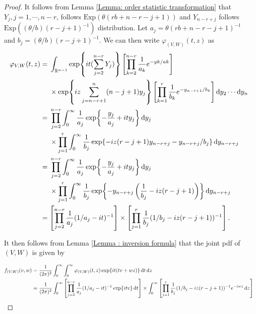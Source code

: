 \documentclass{report}
\begin{document}
\begin{proof}
   It follows from Lemma \ref{Lemma: order statistic transformation} that $Y_j, j = 1, \cdots, n - r$, follows $\mathrm{Exp}(\theta(rb+n-r-j+1))$
   and $Y_{n-r+j}$ follows $\mathrm{Exp}((\theta/b)(r-j+1)^{-1})$ distribution. Let $a_j = \theta(rb+n-r-j+1)^{-1}$ and $b_j =(\theta/b)(r-j+1)^{-1}$.
   We can then write $\varphi_{(V,W)}(t,z)$ as
   \begin{align*}
    \varphi_{V,W}(t,z) &= \begin{aligned}[t]
        &\int_{\RR^{n-1}} \exp{it( \sumj[2]{n-r} Y_j)}\left[\prodk[2]{n-r} \frac{1}{a_k}e^{-yk/ak}\right]
        \\
        &\times \exp{iz \sumj[n-r+1]{n}(n-j+1)y_j} \left[ \prodk{r} \frac{1}{b_k}e^{-y_{n-r+1}/b_k}\right] \dd{y_2}\cdots \dd{y_n}
    \end{aligned}
    \\
      &= \begin{aligned}[t]
        & \prodj[2]{n-r} \int_0^\infty  \frac{1}{a_j}\exp{- \frac{y_j}{a_j} + ity_j} \dd{y_j}
        \\
        &\times \prodj{r} \int_0^\infty \frac{1}{b_j} \exp{-iz(r-j+1)y_{n-r+j} -y_{n-r+j}/b_j} \dd{y_{n-r+j}}
    \end{aligned}
    \\
    &= \begin{aligned}[t]
        & \prodj[2]{n-r} \int_0^\infty  \frac{1}{a_j}\exp{- \frac{y_j}{a_j} + ity_j} \dd{y_j}
        \\
        &\times \prodj{r} \int_0^\infty \frac{1}{b_j} \exp{-y_{n-r+j}\left(\frac{1}{b_j}-iz(r-j+1)\right)} \dd{y_{n-r+j}}
    \end{aligned}
    \\
    &= \left[\prodj[2]{n-r} \frac{1}{a_j}(1/a_j -it)^{-1}\right] \times \left[\prodj{r}\frac{1}{b_j}(1/b_j -iz(r-j+1))^{-1}\right].
   \end{align*}
   
   It then follows from Lemma \ref{Lemma : inversion formula} that the joint pdf of $(V,W)$ is given by 

   \begin{align} \label{eqn: joint pdf f(vw)}
       f_{(V,W)}(v,w) &= \frac{1}{(2\pi)^2} \int_0^\infty \int_0^\infty \varphi_{(V,W)}(t,z) \exp{it(tv+wz)} \dd{t}\dd{z} \nonumber
       \\
       &= \frac{1}{(2\pi)^2} \int_0^\infty \left[ \prodj[2]{n-r} \frac{1}{a_j}(1/a_j -it)^{-1}\exp{itv}\dd{t}\right] \times \int_0^\infty \left[\prodj[1]{r}\frac{1}{b_j}(1/b_j -iz(r-j+1))^{-1}e^{-iwz}\dd{z}\right]
   \end{align}


\end{proof}
\end{document}
